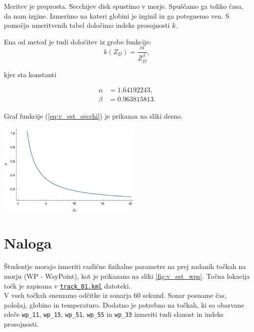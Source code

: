\noindent
Meritev je preprosta. Secchijev disk spustimo v morje. Spuščamo ga toliko časa, da nam izgine. Izmerimo na kateri globini je izginil in ga potegnemo ven. S pomočjo umeritvenih tabel določimo indeks prosojnosti $k$.

\noindent
Ena od metod je tudi določitev iz grobe funkcije:
\begin{equation}
\label{eq:v_est_secchi}
k(Z_D) = \frac{\alpha}{Z_D^{\beta}},
\end{equation}

\begin{minipage}{4cm}
	\noindent
	kjer sta konstanti
	
	\begin{align*}
	\alpha & = 1.64192243,\\
	\beta  & = 0.963815813.
	\end{align*}
	
	\noindent
	Graf funkcije (\ref{eq:v_est_secchi}) je prikazan na sliki desno.
\end{minipage}
\begin{minipage}{7.5cm}
	\centering \includegraphics[width=7cm]{Vaje/KartGlobSlan/figs/secchi_func.pdf}
\end{minipage}

\newpage
\section{Naloga}
Študentje morajo izmeriti različne fizikalne parametre na prej zadanih točkah na morju (WP - WayPoint), kot je prikazano na sliki \ref{fig:v_est_wps}. Točna lokacija točk je zapisana v \href{https://drive.google.com/open?id=0B1dT-CBA07ANWDI0dDdkc1p1TkU}{\texttt{track\_01.kml}} datoteki.\\[5mm]

\noindent
V vseh točkah snemamo odčitke iz sonarja 60 sekund. Sonar posname čas, položaj, globino in temperaturo. Dodatno je potrebno na točkah, ki so obarvane rdeče \texttt{wp\_11}, \texttt{wp\_15}, \texttt{wp\_51}, \texttt{wp\_55} in \texttt{wp\_33} izmeriti tudi slanost in indeks prosojnosti.\\[5mm]

